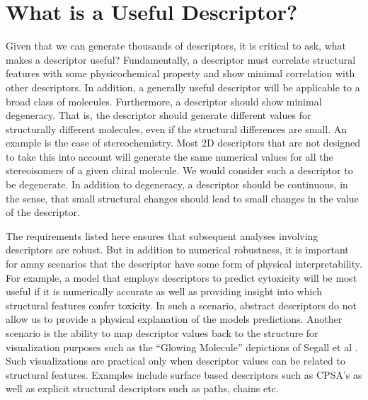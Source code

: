\documentclass[letterpaper, 12pt]{article}
\begin{document}
\section{What is a Useful Descriptor?}
\label{sec:what-usef-descr}

Given that we can generate thousands of descriptors,  it is critical to ask, what
makes a descriptor useful? Fundamentally, a descriptor must correlate
structural features with some physicochemical property and show
minimal correlation with other descriptors. In addition, a generally
useful descriptor will be applicable to a broad class of
molecules. Furthermore, a descriptor should show minimal
degeneracy. That is, the descriptor should generate different values
for structurally different molecules, even if the structural
differences are small. An example is the case of stereochemistry. Most
2D descriptors that are not designed to take this into account will
generate the same numerical values for all the stereoisomers of a
given chiral molecule. We would consider such a descriptor to be
degenerate. In addition to degeneracy, a descriptor should be
continuous, in the sense, that small structural changes should lead to
small changes in the value of the descriptor.

The requirements listed here ensures that subsequent analyses
involving descriptors are robust. But in addition to numerical
robustness, it is important for amny scenarios that the descriptor
have some form of physical interpretability.  For example, a model
that employs descriptors to predict cytoxicity will be most useful if
it is numerically accurate as well as providing insight into which
structural features confer toxicity. In such a scenario, abstract
descriptors do not allow us to provide a physical explanation of the
models predictions. Another scenario is the ability to map descriptor
values back to the structure for visualization purposes such as the
``Glowing Molecule'' depictions of Segall et al
\cite{Segall:2009fk}. Such visualizations are practical only when
descriptor values can be related to structural features. Examples
include surface based descriptors such as CPSA's as well as explicit
structural descriptors such as paths, chains etc.
\end{document}
